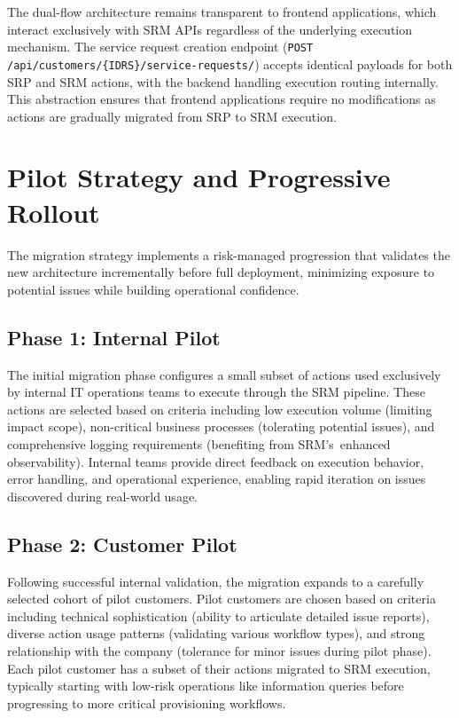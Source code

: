 The dual-flow architecture remains transparent to frontend applications, which interact exclusively with SRM APIs regardless of the underlying execution mechanism. The service request creation endpoint (\texttt{POST /api/customers/\{IDRS\}/service-requests/}) accepts identical payloads for both SRP and SRM actions, with the backend handling execution routing internally. This abstraction ensures that frontend applications require no modifications as actions are gradually migrated from SRP to SRM execution.

\section{Pilot Strategy and Progressive Rollout}

The migration strategy implements a risk-managed progression that validates the new architecture incrementally before full deployment, minimizing exposure to potential issues while building operational confidence.

\subsection{Phase 1: Internal Pilot}

The initial migration phase configures a small subset of actions used exclusively by internal IT operations teams to execute through the SRM pipeline. These actions are selected based on criteria including low execution volume (limiting impact scope), non-critical business processes (tolerating potential issues), and comprehensive logging requirements (benefiting from SRM's~enhanced observability). Internal teams provide direct feedback on execution behavior, error handling, and operational experience, enabling rapid iteration on issues discovered during real-world usage.

\subsection{Phase 2: Customer Pilot}

Following successful internal validation, the migration expands to a carefully selected cohort of pilot customers. Pilot customers are chosen based on criteria including technical sophistication (ability to articulate detailed issue reports), diverse action usage patterns (validating various workflow types), and strong relationship with the company (tolerance for minor issues during pilot phase). Each pilot customer has a subset of their actions migrated to SRM execution, typically starting with low-risk operations like information queries before progressing to more critical provisioning workflows.

